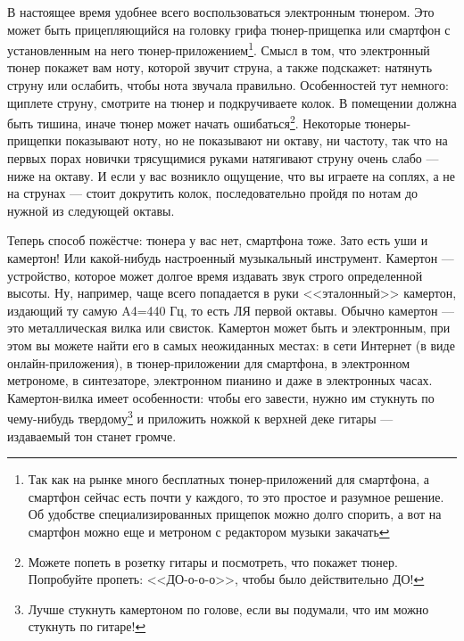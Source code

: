 В настоящее время удобнее всего воспользоваться электронным тюнером. Это может быть прицепляющийся на головку грифа тюнер-прищепка или смартфон с установленным на него тюнер-приложением\footnote{Так как на рынке много бесплатных тюнер-приложений для смартфона, а смартфон сейчас есть почти у каждого, то это простое и разумное решение. Об удобстве специализированных прищепок можно долго спорить, а вот на смартфон можно еще и метроном с редактором музыки закачать}. Смысл в том, что электронный тюнер покажет вам ноту, которой звучит струна, а также подскажет: натянуть струну или ослабить, чтобы нота звучала правильно. Особенностей тут немного: щиплете струну, смотрите на тюнер и подкручиваете колок. В помещении должна быть тишина, иначе тюнер может начать ошибаться\footnote{Можете попеть в розетку гитары и посмотреть, что покажет тюнер. Попробуйте пропеть: <<ДО-о-о-о>>, чтобы было действительно ДО!}. Некоторые тюнеры-прищепки показывают ноту, но не показывают ни октаву, ни частоту, так что на первых порах новички трясущимися руками натягивают струну очень слабо --- ниже на октаву. И если у вас возникло ощущение, что вы играете на соплях, а не на струнах --- стоит докрутить колок, последовательно пройдя по нотам до нужной из следующей октавы.

Теперь способ пожёстче: тюнера у вас нет, смартфона тоже. Зато есть уши и камертон! Или какой-нибудь настроенный музыкальный инструмент. Камертон --- устройство, которое может долгое время издавать звук строго определенной высоты. Ну, например, чаще всего попадается в руки <<эталонный>> камертон, издающий ту самую A4=440 Гц, то есть ЛЯ первой октавы. Обычно камертон --- это металлическая вилка или свисток. Камертон может быть и электронным, при этом вы можете найти его в самых неожиданных местах: в сети Интернет (в виде онлайн-приложения), в тюнер-приложении для смартфона, в электронном метрономе, в синтезаторе, электронном пианино и даже в электронных часах. Камертон-вилка имеет особенности: чтобы его завести, нужно им стукнуть по чему-нибудь твердому\footnote{Лучше стукнуть камертоном по голове, если вы подумали, что им можно стукнуть по гитаре!} и приложить ножкой к верхней деке гитары --- издаваемый тон станет громче.


